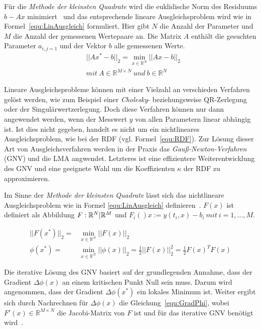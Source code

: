 Für die \textit{Methode der kleinsten Quadrate} wird die euklidische Norm des Residuums $b-Ax$ minimiert~\cite{dahmen2008numerik} und das entsprechende lineare Ausgleichsproblem wird wie in Formel~\ref{equ:LinAusgleich} formuliert. Hier gibt $N$ die Anzahl der Parameter und $M$ die Anzahl der gemessenen Wertepaare an. Die Matrix $A$ enthält die gesuchten Parameter $a_{i,j=1}$ und der Vektor $b$ alle gemessenen Werte.
\begin{equation}
\label{equ:LinAusgleich}
\begin{aligned}
& ||Ax^*-b||_2 = \min_{x\in \mathbb{R}^N} ||Ax-b||_2\\
& mit\ A\in \mathbb{R}^{M\times N}\ und\ b\in \mathbb{R}^{N}
\end{aligned}
\end{equation}

Lineare Ausgleichsprobleme können mit einer Vielzahl an verschieden Verfahren gelöst werden, wie zum Beispiel einer \textit{Cholesky}- beziehungsweise QR-Zerlegung oder der Singulärwertzerlegung.
Doch diese Verfahren können nur dann angewendet werden, wenn der Messwert $y$ von allen Parametern linear abhängig ist. Ist dies nicht gegeben, handelt es nicht um ein nichtlineares Ausgleichsproblem, wie bei der RDF (vgl. Formel~\ref{equ:RDF}). Zur Lösung dieser Art von Ausgleichsverfahren werden in der Praxis das \textit{Gauß-Newton-Verfahren} (GNV) und die LMA angwendet. Letzteres ist eine effizientere Weiterentwicklung des GNV und eine geeignete Wahl um die Koeffizienten $\kappa$ der RDF zu approximieren.

Im Sinne der \textit{Methode der kleinsten Quadrate} lässt sich das nichtlineare Ausgleichsproblem wie in Formel \ref{equ:LinAusgleich} definieren~\cite{schwarz2011numerische}. $F(x)$ ist definiert als Abbildung $F: \mathbb{R}^N \arrowvert \mathbb{R}^M$ und $F_i()x:= y(t_i,x)-b_i\ mit\ i= 1,\dots,M$. 

\begin{equation}
\label{equ:LinAusgleich}
\begin{aligned}
||F(x^*)||_2 =& \min_{x\in \mathbb{R}^N} ||F(x)||_2\\
\phi(x^*)=& \min_{x\in \mathbb{R}^N} ||\phi(x)||_2 = \frac{1}{2}||F(x)||_2^2 = \frac{1}{2}F(x)^TF(x)
\end{aligned}
\end{equation}

Die iterative Lösung des GNV basiert auf der grundlegenden Annahme, dass der Gradient $\Delta\phi(x)$ an einem kritischen Punkt Null sein muss. Darum wird angenommen, dass der Gradient $\Delta\phi(x^*)$ ein lokales Minimum ist. Weiter ergibt sich durch Nachrechnen für $\Delta\phi(x)$ die Gleichung~\ref{equ:GradPhi}, wobei $F'(x) \in \mathbb{R}^{M \times N}$ die Jacobi-Matrix von $F$ ist und für das iterative GNV benötigt wird~\cite{dahmen2008numerik}.


